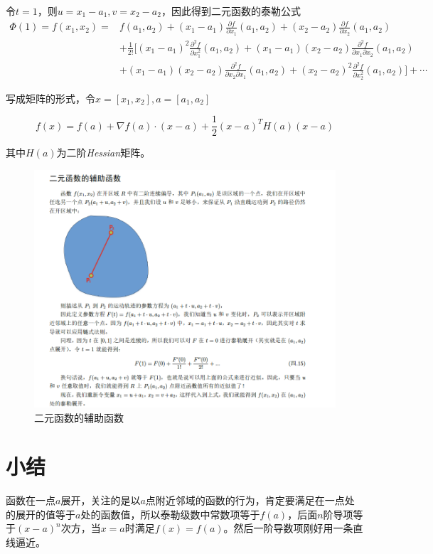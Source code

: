 令$t=1$，则$u=x_1-a_1,v=x_2-a_2$，因此得到二元函数的泰勒公式
\begin{equation}
    \begin{aligned}
        \Phi(1)=f(x_1,x_2)= &f(a_1,a_2)+(x_1-a_1)\frac{\partial f}{\partial x_1}(a_1,a_2)+(x_2-a_2)\frac{\partial f}{\partial x_2}(a_1,a_2) \\
        & +\frac{1}{2!} [(x_1-a_1)^2\frac{\partial^2 f}{\partial x_1^2}(a_1,a_2)+(x_1-a_1)(x_2-a_2)\frac{\partial^2 f}{\partial x_1\partial x_2}(a_1,a_2)\\
        & +(x_1-a_1)(x_2-a_2)\frac{\partial^2 f}{\partial x_2\partial x_1}(a_1,a_2)+(x_2-a_2)^2\frac{\partial^2 f}{\partial x_2^2}(a_1,a_2)]+\cdots
    \end{aligned}
\end{equation}

写成矩阵的形式，令$x=[x_1,x_2],a=[a_1,a_2]$

\begin{equation}
    f(x)=f(a)+\nabla f(a)\cdot (x-a)+\frac{1}{2}(x-a)^T H(a)(x-a)
\end{equation}

其中$H(a)$为二阶\textsl{Hessian}矩阵。

\begin{figure}[H]
    \centering
    \includegraphics[scale=0.5]{figures/二元函数的辅助函数.png}
    \caption{二元函数的辅助函数}
\end{figure}

\section{小结}


函数在一点$a$展开，关注的是以$a$点附近邻域的函数的行为，肯定要满足在一点处的展开的值等于$a$处的函数值，所以泰勒级数中常数项等于$f(a)$，后面$n$阶导项等于$(x-a)^n$次方，当$x=a$时满足$f(x)=f(a)$。然后一阶导数项刚好用一条直线逼近。